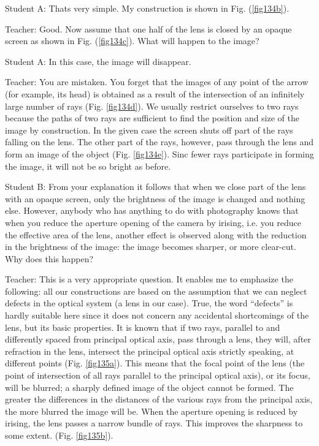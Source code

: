 \documentclass[a4paper,12pt]{book}
\begin{document}
{ {\sc Student A:} Thats very simple. My construction is shown in Fig. (\ref{fig134b}).

{\sc Teacher:} Good. Now assume that one half of the lens is closed by an opaque screen as shown in Fig. (\ref{fig134c}). What will happen to the image?

{\sc Student A:} In this case, the image will disappear.

{\sc Teacher:} You are mistaken. You forget that the images of any point of the arrow (for example, its head) is obtained as a result of the intersection of an infinitely large number of rays (Fig. \ref{fig134d}). We usually restrict ourselves to two rays because the paths of two rays are sufficient to find the position and size of the image by construction. In the given case the screen shuts off part of the rays falling on the lens. The other part of the rays, however, pass through the lens and form an image of the object (Fig. \ref{fig134e}).  Sinc fewer rays participate in forming the image, it will not be so bright as before.

{\sc Student B:} From your explanation it follows that when we close part of the lens with an opaque screen, only the brightness of the image is changed and nothing else. However, anybody who has anything to do with photography knows that when you reduce the aperture opening of the camera by irising, i.e. you reduce the effective area of the lens, another effect is observed along with the reduction in the brightness of the image: the image becomes sharper, or more clear-cut. Why does this happen?

{\sc Teacher:} This is a very appropriate question. It enables me to emphasize the following: all our constructions are based on the assumption that we can neglect defects in the optical system (a lens in our case). True, the word ``defects'' is hardly suitable here since it does not concern any accidental shortcomings of the lens, but its basic properties. It is known that if two rays, parallel to and differently spaced from principal optical axis, pass through a lens, they will, after refraction in the lens, intersect the principal optical axis strictly speaking, at different points (Fig. \ref{fig135a}). This means that the focal point of the lens (the point of intersection of all rays parallel to the principal optical axis), or its focus, will be blurred; a sharply defined image of the object cannot be formed. The greater the differences in the distances of the various rays from the principal axis,  the more blurred the image will be. When the aperture opening is reduced by irising, the lens passes a narrow bundle of rays. This improves the sharpness to some extent. (Fig. \ref{fig135b}).

}
\end{document}
